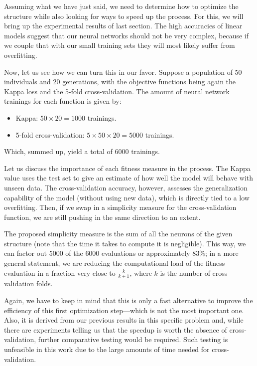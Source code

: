 	Assuming what we have just said, we need to determine how to optimize the structure while also looking for ways to speed up the process. For this, we will bring up the experimental results of last section. The high accuracies of linear models suggest that our neural networks should not be very complex, because if we couple that with our small training sets they will most likely suffer from overfitting.

\newpage

	Now, let us see how we can turn this in our favor. Suppose a population of 50 individuals and 20 generations, with the objective functions being again the Kappa loss and the 5-fold cross-validation. The amount of neural network trainings for each function is given by:

	\begin{itemize}

		\item
		Kappa: $50 \times 20 = 1000$ trainings.

		\item
		5-fold cross-validation: $5 \times 50 \times 20 = 5000$ trainings.

	\end{itemize}

	Which, summed up, yield a total of $6000$ trainings.

	Let us discuss the importance of each fitness measure in the process. The Kappa value uses the test set to give an estimate of how well the model will behave with unseen data. The cross-validation accuracy, however, assesses the generalization capability of the model (without using new data), which is directly tied to a low overfitting. Then, if we swap in a simplicity measure for the cross-validation function, we are still pushing in the same direction to an extent.

	The proposed simplicity measure is the sum of all the neurons of the given structure (note that the time it takes to compute it is negligible). This way, we can factor out $5000$ of the $6000$ evaluations or approximately $83\%$; in a more general statement, we are reducing the computational load of the fitness evaluation in a fraction very close to $\frac{k}{k+1}$, where $k$ is the number of cross-validation folds.

	Again, we have to keep in mind that this is only a fast alternative to improve the efficiency of this first optimization step---which is not the most important one. Also, it is derived from our previous results in this specific problem and, while there are experiments telling us that the speedup is worth the absence of cross-validation, further comparative testing would be required. Such testing is unfeasible in this work due to the large amounts of time needed for cross-validation.

